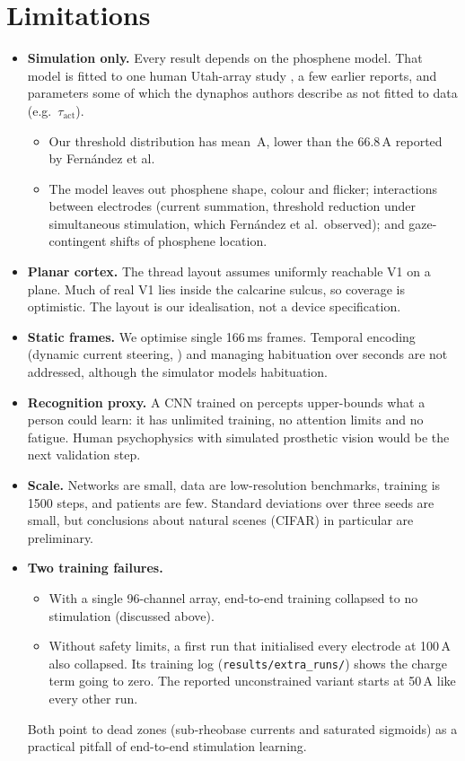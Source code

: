 \section{Limitations}\label{sec:limits}
\begin{itemize}
\item \textbf{Simulation only.} Every result depends on the phosphene model. That model is fitted to one human Utah-array study \citep{fernandez2021visual}, a few earlier reports, and parameters some of which the dynaphos authors describe as not fitted to data (e.g.\ $\tau_{\mathrm{act}}$).
  \begin{itemize}
  \item Our threshold distribution has mean \NumThrMean\,\textmu A, lower than the 66.8\,\textmu A reported by Fernández et al.
  \item The model leaves out phosphene shape, colour and flicker; interactions between electrodes (current summation, threshold reduction under simultaneous stimulation, which Fernández et al.\ observed); and gaze-contingent shifts of phosphene location.
  \end{itemize}
\item \textbf{Planar cortex.} The thread layout assumes uniformly reachable V1 on a plane. Much of real V1 lies inside the calcarine sulcus, so coverage is optimistic. The layout is our idealisation, not a device specification.
\item \textbf{Static frames.} We optimise single 166\,ms frames. Temporal encoding (dynamic current steering, \citealp{beauchamp2020dynamic}) and managing habituation over seconds are not addressed, although the simulator models habituation.
\item \textbf{Recognition proxy.} A CNN trained on percepts upper-bounds what a person could learn: it has unlimited training, no attention limits and no fatigue. Human psychophysics with simulated prosthetic vision would be the next validation step.
\item \textbf{Scale.} Networks are small, data are low-resolution benchmarks, training is 1500 steps, and patients are few. Standard deviations over three seeds are small, but conclusions about natural scenes (CIFAR) in particular are preliminary.
\item \textbf{Two training failures.}
  \begin{itemize}
  \item With a single 96-channel array, end-to-end training collapsed to no stimulation (discussed above).
  \item Without safety limits, a first run that initialised every electrode at 100\,\textmu A also collapsed. Its training log (\texttt{results/extra\_runs/}) shows the charge term going to zero. The reported unconstrained variant starts at 50\,\textmu A like every other run.
  \end{itemize}
  Both point to dead zones (sub-rheobase currents and saturated sigmoids) as a practical pitfall of end-to-end stimulation learning.
\end{itemize}

